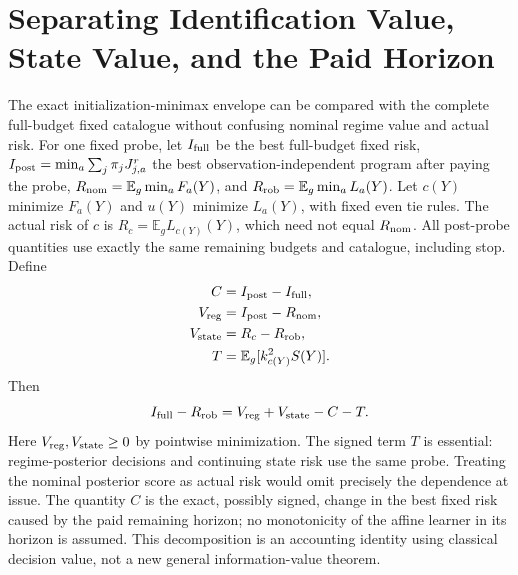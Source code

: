 \section{Separating Identification Value, State Value, and the Paid Horizon}
The exact initialization-minimax envelope can be compared with the complete
full-budget fixed catalogue without confusing nominal regime value and actual risk.
For one fixed probe, let $I_{\rm full}$ be the best full-budget fixed risk,
$I_{\rm post}=\min_a\sum_j\pi_jJ_{j,a}^{r}$ the best observation-independent
program after paying the probe, $R_{\rm nom}=\mathbb E_g\min_aF_a(Y)$,
and $R_{\rm rob}=\mathbb E_g\min_aL_a(Y)$.
Let $c(Y)$ minimize $F_a(Y)$ and $u(Y)$ minimize $L_a(Y)$, with fixed even tie
rules. The actual risk of $c$ is $R_c=\mathbb E_gL_{c(Y)}(Y)$, which need not
equal $R_{\rm nom}$.
All post-probe quantities use exactly the same remaining budgets and catalogue,
including stop.
Define
\begin{align*}
C&=I_{\rm post}-I_{\rm full},\\
V_{\rm reg}&=I_{\rm post}-R_{\rm nom},\\
V_{\rm state}&=R_c-R_{\rm rob},\\
T&=\mathbb E_g[k_{c(Y)}^2S(Y)].
\end{align*}
Then
\begin{equation}
I_{\rm full}-R_{\rm rob}=V_{\rm reg}+V_{\rm state}-C-T.
\label{eq:research-value-decomposition}
\end{equation}
Here $V_{\rm reg},V_{\rm state}\ge0$ by pointwise minimization.
The signed term $T$ is essential: regime-posterior decisions and continuing
state risk use the same probe. Treating the nominal posterior score as actual
risk would omit precisely the dependence at issue.
The quantity $C$ is the exact, possibly signed, change in the best
fixed risk caused by the paid remaining horizon; no monotonicity of the affine
learner in its horizon is assumed.
This decomposition is an accounting identity using classical decision value,
not a new general information-value theorem.

